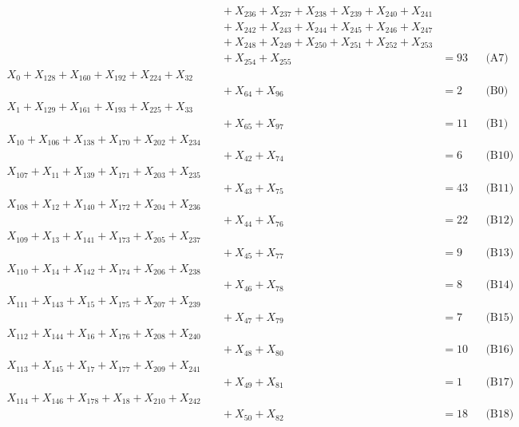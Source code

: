 \documentclass[a4paper,10pt]{article}
\begin{document}
{\begin{align}
&\quad  + X_{236} + X_{237} + X_{238} + X_{239} + X_{240} + X_{241} \\[0.5ex]
&\quad  + X_{242} + X_{243} + X_{244} + X_{245} + X_{246} + X_{247} \\[0.5ex]
&\quad  + X_{248} + X_{249} + X_{250} + X_{251} + X_{252} + X_{253} \\[0.5ex]
&\quad  + X_{254} + X_{255} &= 93 && \text{(A7)} \\
X_{0} + X_{128} + X_{160} + X_{192} + X_{224} + X_{32} \\[0.5ex]
&\quad  + X_{64} + X_{96} &= 2 && \text{(B0)} \\
X_{1} + X_{129} + X_{161} + X_{193} + X_{225} + X_{33} \\[0.5ex]
&\quad  + X_{65} + X_{97} &= 11 && \text{(B1)} \\
X_{10} + X_{106} + X_{138} + X_{170} + X_{202} + X_{234} \\[0.5ex]
&\quad  + X_{42} + X_{74} &= 6 && \text{(B10)} \\
X_{107} + X_{11} + X_{139} + X_{171} + X_{203} + X_{235} \\[0.5ex]
&\quad  + X_{43} + X_{75} &= 43 && \text{(B11)} \\
X_{108} + X_{12} + X_{140} + X_{172} + X_{204} + X_{236} \\[0.5ex]
&\quad  + X_{44} + X_{76} &= 22 && \text{(B12)} \\
X_{109} + X_{13} + X_{141} + X_{173} + X_{205} + X_{237} \\[0.5ex]
&\quad  + X_{45} + X_{77} &= 9 && \text{(B13)} \\
X_{110} + X_{14} + X_{142} + X_{174} + X_{206} + X_{238} \\[0.5ex]
&\quad  + X_{46} + X_{78} &= 8 && \text{(B14)} \\
X_{111} + X_{143} + X_{15} + X_{175} + X_{207} + X_{239} \\[0.5ex]
&\quad  + X_{47} + X_{79} &= 7 && \text{(B15)} \\
X_{112} + X_{144} + X_{16} + X_{176} + X_{208} + X_{240} \\[0.5ex]
&\quad  + X_{48} + X_{80} &= 10 && \text{(B16)} \\
X_{113} + X_{145} + X_{17} + X_{177} + X_{209} + X_{241} \\[0.5ex]
&\quad  + X_{49} + X_{81} &= 1 && \text{(B17)} \\
X_{114} + X_{146} + X_{178} + X_{18} + X_{210} + X_{242} \\[0.5ex]
&\quad  + X_{50} + X_{82} &= 18 && \text{(B18)} \\

\end{align}}
\end{document}
